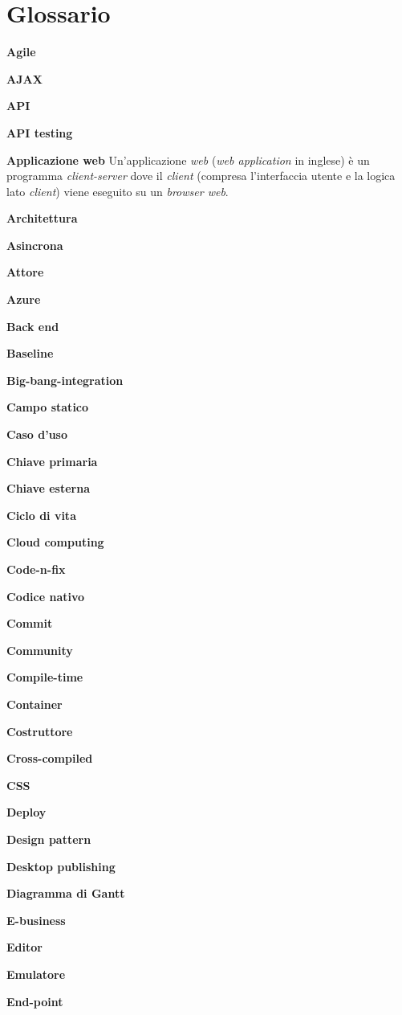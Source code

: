 \chapter{Glossario} \label{gloss}

\textbf{Agile}

\textbf{AJAX}

\textbf{API}

\textbf{API testing}

\textbf{Applicazione web} Un'applicazione \textit{web} (\textit{web application} in inglese) è un programma \textit{client-server} dove il \textit{client} (compresa l'interfaccia utente e la logica lato \textit{client}) viene eseguito su un \textit{browser web}.

\textbf{Architettura}

\textbf{Asincrona}

\textbf{Attore}

\textbf{Azure}

\textbf{Back end}

\textbf{Baseline}

\textbf{Big-bang-integration}

\textbf{Campo statico}

\textbf{Caso d'uso}

\textbf{Chiave primaria}

\textbf{Chiave esterna}

\textbf{Ciclo di vita}

\textbf{Cloud computing}

\textbf{Code-n-fix}

\textbf{Codice nativo}

\textbf{Commit}

\textbf{Community}

\textbf{Compile-time}

\textbf{Container}

\textbf{Costruttore}

\textbf{Cross-compiled}

\textbf{CSS}

\textbf{Deploy}

\textbf{Design pattern}

\textbf{Desktop publishing}

\textbf{Diagramma di Gantt}

\textbf{E-business}

\textbf{Editor}

\textbf{Emulatore}

\textbf{End-point}

